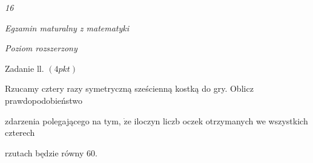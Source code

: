 \documentclass[a4paper,12pt]{article}
\begin{document}
{\it 16}

{\it Egzamin maturalny z matematyki}

{\it Poziom rozszerzony}

Zadanie ll. $(4pkt)$

Rzucamy cztery razy symetryczną sześcienną kostką do gry. Oblicz prawdopodobieństwo

zdarzenia polegającego na tym, $\dot{\mathrm{z}}\mathrm{e}$ iloczyn liczb oczek otrzymanych we wszystkich czterech

rzutach będzie równy 60.
\end{document}
